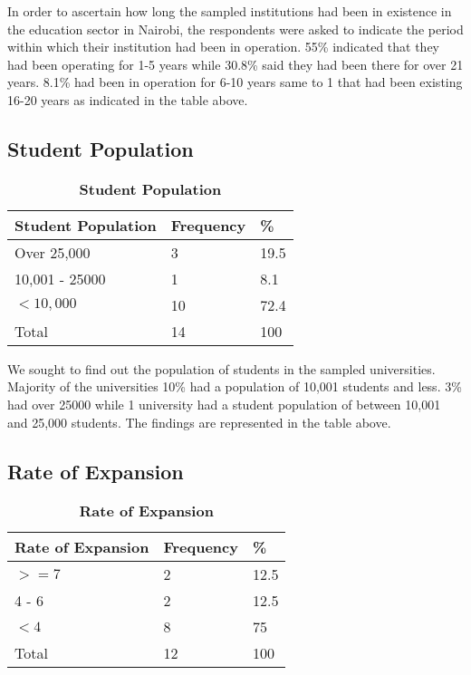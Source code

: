 In order to ascertain how long the sampled institutions had been in existence in the education sector in Nairobi, the respondents were asked to indicate the period within which their institution had been in operation. 55\% indicated that they had been operating for 1-5 years while 30.8\% said they had been there for over 21 years. 8.1\% had been in operation for 6-10 years same to 1 that had been existing 16-20 years as indicated in the table above.

\subsection{\textbf{Student Population}}

\begin{table}[ht]
    \centering
\begin{tabular}{|l|l|l|}
\hline
   \textbf{Student Population} & \textbf{Frequency} & \textbf{\%}\\ \hline
   Over 25,000	& 3 & 19.5\\ \hline  
   10,001 - 25000 & 1 & 8.1\\ \hline  
   $<10,000$ & 10 & 72.4\\ \hline   
   Total & 14 & 100\\ \hline  
\end{tabular}
    \caption{\textbf{Student Population}}
\end{table}

We sought to find out the population of students in the sampled universities. Majority of the universities 10\% had a population of 10,001 students and less. 3\% had over 25000 while 1 university had a student population of between 10,001 and 25,000 students. The findings are represented in the table above.

\subsection{\textbf{Rate of Expansion}}

\begin{table}[ht]
    \centering
\begin{tabular}{|l|l|l|}
\hline
   \textbf{Rate of Expansion} & \textbf{Frequency} & \textbf{\%}\\ \hline
   $>= 7$	& 2 & 12.5\\ \hline  
   4 - 6 & 2 & 12.5\\ \hline  
   $<4$ & 8 & 75\\ \hline   
   Total & 12 & 100\\ \hline  
\end{tabular}
    \caption{\textbf{Rate of Expansion}}
\end{table}

